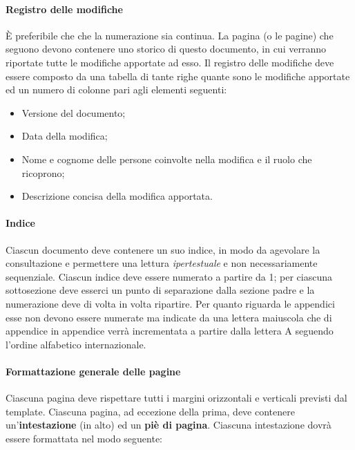 	\paragraph{Registro delle modifiche}
È preferibile che che la numerazione sia continua. La pagina (o le pagine) che seguono devono contenere uno storico di questo documento, in cui verranno riportate tutte le modifiche apportate ad esso. Il registro delle modifiche deve essere composto da una tabella di tante righe quante sono le modifiche apportate ed un numero di colonne pari agli elementi seguenti:
	
	\begin{itemize}
	
		\item Versione del documento;
		\item Data della modifica;
		\item Nome e cognome delle persone coinvolte nella modifica e il ruolo che ricoprono;
		\item Descrizione concisa della modifica apportata.
	
	\end{itemize}
	
	\paragraph{Indice}
	
	Ciascun documento deve contenere un suo indice, in modo da agevolare la consultazione e permettere una lettura \textit{ipertestuale} e non necessariamente sequenziale. Ciascun indice deve essere numerato a partire da 1; per ciascuna sottosezione deve esserci un punto di separazione dalla sezione padre e la numerazione deve di volta in volta ripartire. Per quanto riguarda le appendici esse non devono essere numerate ma indicate da una lettera maiuscola che di appendice in appendice verrà incrementata a partire dalla lettera A seguendo l'ordine alfabetico internazionale.
	
	\paragraph{Formattazione generale delle pagine}
	
	Ciascuna pagina deve rispettare tutti i margini orizzontali e verticali previsti dal template. Ciascuna pagina, ad eccezione della prima, deve contenere un'\textbf{intestazione} (in alto) ed un \textbf{piè di pagina}. Ciascuna intestazione dovrà essere formattata nel modo seguente:

